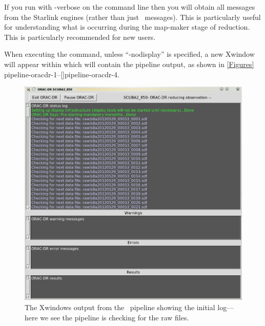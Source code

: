 \begin{tip}
  If you run with -verbose on the command line then you will obtain all messages
 from the Starlink engines (rather than just \oracdr\ messages). This is
 particularly useful for understanding what is occurring during the map-maker stage
 of reduction. This is particularly recommended for new users.
\end{tip}

When executing the \oracdr command, unless ``-nodisplay'' is specified,
a new Xwindow will appear within which
will contain the pipeline output, as shown in \cref{Figures}
{pipeline-oracdr-1}{}--\cref{}{pipeline-oracdr-4}{}.

\begin{figure}
\begin{center}
\includegraphics[width=0.7\linewidth]{sc21-pipeline-oracdr-1}
\caption[Output from the pipeline]{The Xwindows output from the \oracdr\
pipeline showing the initial log---here we see the pipeline is checking
for the raw files. \label{pipeline-oracdr-1}}
\end{center}
\end{figure}

